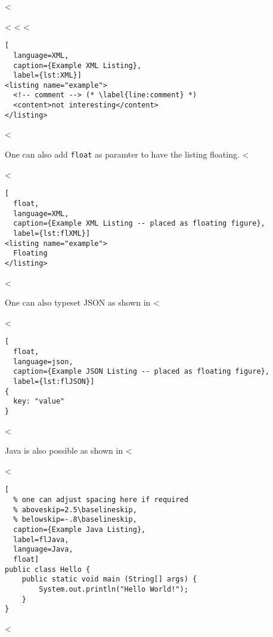 <%

<%
<%
<%

\begin{lstlisting}[
  language=XML,
  caption={Example XML Listing},
  label={lst:XML}]
<listing name="example">
  <!-- comment --> (* \label{line:comment} *)
  <content>not interesting</content>
</listing>
\end{lstlisting}
<%

One can also add \verb+float+ as paramter to have the listing floating.
<%

<%
\begin{lstlisting}[
  float,
  language=XML,
  caption={Example XML Listing -- placed as floating figure},
  label={lst:flXML}]
<listing name="example">
  Floating
</listing>
\end{lstlisting}
<%

One can also typeset JSON as shown in <%

<%
\begin{lstlisting}[
  float,
  language=json,
  caption={Example JSON Listing -- placed as floating figure},
  label={lst:flJSON}]
{
  key: "value"
}
\end{lstlisting}
<%

Java is also possible as shown in <%

<%
\begin{lstlisting}[
  % one can adjust spacing here if required
  % aboveskip=2.5\baselineskip,
  % belowskip=-.8\baselineskip,
  caption={Example Java Listing},
  label=flJava,
  language=Java,
  float]
public class Hello {
    public static void main (String[] args) {
        System.out.println("Hello World!");
    }
}
\end{lstlisting}
<%
